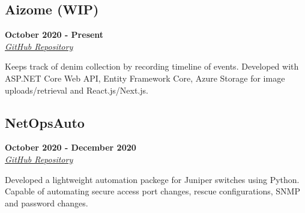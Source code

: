 \documentclass[10pt]{article}
\begin{document}
\begin{paracol}{2}
    \begin{leftcolumn} 
        \sloppy
        \subsection*{Aizome (WIP)}
        \textbf{October 2020 - Present} \\
        \textit{\href{https://github.com/dmtx97/Aizome}{\underline{GitHub Repository}}}
    \end{leftcolumn}
    \begin{rightcolumn} 
        \vspace{.2cm}
        \begin{flushleft} 
            Keeps track of denim collection by recording timeline of events. Developed with ASP.NET Core Web API, Entity Framework Core, Azure Storage for image uploads/retrieval and React.js/Next.js.        \end{flushleft}
        \vspace{-.6cm}
    \end{rightcolumn}    
\end{paracol}

\begin{paracol}{2}
    \begin{leftcolumn} 
        \sloppy
        \subsection*{NetOpsAuto}
        \textbf{October 2020 - December 2020} \\
        \textit{\href{https://github.com/dmtx97/netopsauto}{\underline{GitHub Repository}}}
    \end{leftcolumn}
    \begin{rightcolumn} 
        \vspace{.2cm}
        \begin{flushleft} 
            Developed a lightweight automation packege for Juniper switches using Python. Capable of automating secure access port changes, rescue configurations, SNMP and password changes.
        \end{flushleft}
        \vspace{-.4cm}
    \end{rightcolumn}
\end{paracol}
\end{document}

